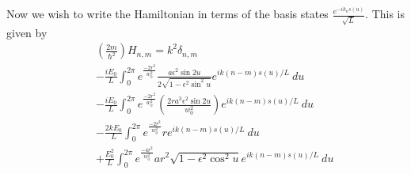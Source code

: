 \documentclass[aps,pra,showpacs,twocolumn]{revtex4}
\begin{document}
Now we wish to write the Hamiltonian in terms of the basis states $\frac{e^{-i k_{n} s(u)}}{\sqrt{L}}$.  This is given by
\begin{eqnarray}
&&\left(\frac{2m}{\hbar^2}\right)H_{n,m}=k^2\delta_{n,m} \nonumber \\
&& -\frac{i E_0}{L} \int_0^{2\pi} e^{\frac{-2r^2}{w_0^2}}\frac{a\epsilon^2 \sin{2u}}{2\sqrt{1-\epsilon^2 \sin^2 u}}e^{ik(n-m)s(u)/L}\:du \nonumber \\
&&-\frac{i E_0}{L}\int_0^{2\pi} e^{\frac{-2r^2}{w_0^2}}\left(\frac{2ra^3\epsilon^2 \sin{2u}}{w_0^2}\right)e^{ik(n-m)s(u)/L}\:du \nonumber \\
&&-\frac{2kE_0}{L}\int_0^{2\pi} e^{\frac{-2r^2}{w_0^2}}re^{ik(n-m)s(u)/L}\:du \nonumber \\
&&+\frac{E_0^2}{L}\int_0^{2\pi}e^{\frac{-4r^2}{w_0^2}}ar^2\sqrt{1-\epsilon^2 \cos^2 u}e^{ik(n-m)s(u)/L}\:du \nonumber \\
\end{eqnarray}
\end{document}
